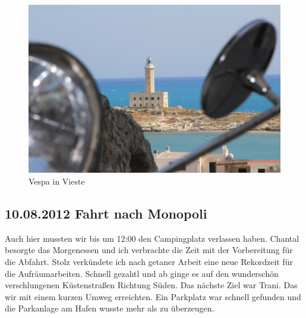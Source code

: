 \begin{figure}[H]
    \centering
    \includegraphics[width=\textwidth]{../Bilder/Sommer2012/30.jpg}
    \caption{Vespa in Vieste}
    \label{img:Sommer4}
\end{figure}

\subsection{10.08.2012 Fahrt nach Monopoli}
Auch hier mussten wir bis um 12:00 den Campingplatz verlassen haben.
Chantal besorgte das Morgenessen und ich verbrachte die Zeit mit der Vorbereitung für die Abfahrt.
Stolz verkündete ich nach getaner Arbeit eine neue Rekordzeit für die Aufräumarbeiten.
Schnell gezahtl und ab ginge es auf den wunderschön verschlungenen Küstenstraßen Richtung Süden.
Das nächste Ziel war Trani.
Das wir mit einem kurzen Umweg erreichten.
Ein Parkplatz war schnell gefunden und die Parkanlage am Hafen wusste mehr als zu überzeugen.

